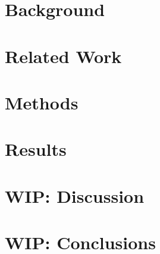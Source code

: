 \section*{Background}
 
\section*{Related Work}
 
\section*{Methods} 
 
\section*{Results}
 
\section*{WIP: Discussion} 
 
\section*{WIP: Conclusions}
 
